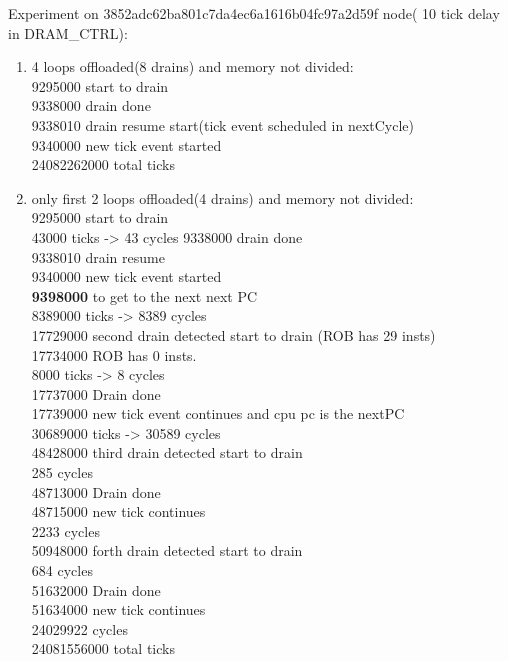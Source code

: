 \documentclass[11pt]{article}
\begin{document}
Experiment on 3852adc62ba801c7da4ec6a1616b04fc97a2d59f node( 10 tick delay in DRAM\_CTRL):
\begin{enumerate}
	\item 4 loops offloaded(8 drains) and memory not divided: \\
	
	9295000 start to drain\\
	9338000 drain done \\
	9338010 drain resume start(tick event scheduled in nextCycle)\\
	9340000 new tick event started\\
	24082262000 total ticks
	
	\item only first 2 loops offloaded(4 drains) and memory not divided:\\
	
	9295000 start to drain\\
	43000 ticks -> 43 cycles
	9338000 drain done\\
  9338010 drain resume\\
  9340000 new tick event started\\
  \textbf{9398000} to get to the next next PC\\
  8389000 ticks -> 8389 cycles\\
  17729000 second drain detected start to drain (ROB has 29 insts)\\
  17734000 ROB has 0 insts.\\
  8000 ticks -> 8 cycles\\
  17737000 Drain done\\
  17739000 new tick event continues and cpu pc is the nextPC\\
  30689000 ticks -> 30589 cycles\\
  48428000 third drain detected start to drain\\
  285 cycles\\
  48713000 Drain done\\
  48715000 new tick continues\\
  2233 cycles\\
  50948000 forth drain detected start to drain\\
  684 cycles\\
  51632000 Drain done\\
  51634000 new tick continues\\
  24029922 cycles\\
  24081556000 total ticks
  

\end{enumerate}
\end{document}
